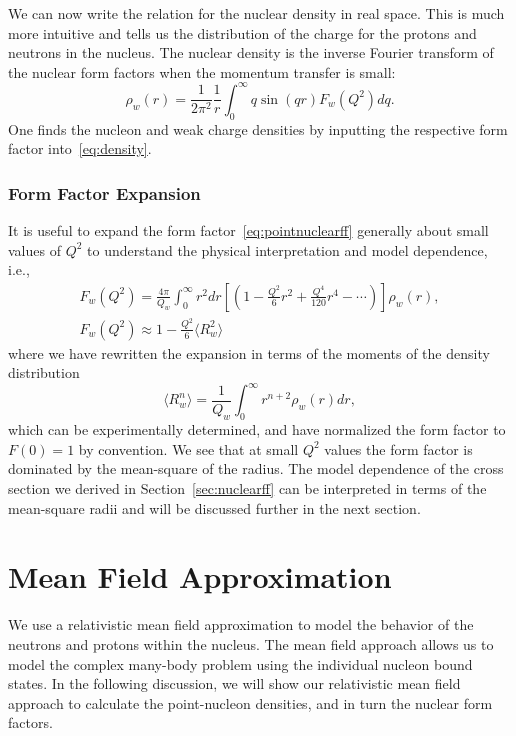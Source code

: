 We can now write the relation for the nuclear density in real space. This is much more intuitive and tells us the distribution of the charge for the protons and neutrons in the nucleus. The nuclear density is the inverse Fourier transform of the nuclear form factors when the momentum transfer is small: 
\begin{equation}\label{eq:density}
\rho _w(r) = \frac{1}{2\pi ^2}\frac{1}{r}\int _0^{\infty} q \sin (qr) F_{w}(Q^2) dq.
\end{equation}
One finds the nucleon and weak charge densities by inputting the respective form factor into~\eqref{eq:density}. 

\subsubsection{Form Factor Expansion}

It is useful to expand the form factor~\eqref{eq:pointnuclearff} generally about small values of $Q^2$ to understand the physical interpretation and model dependence, i.e., 
\begin{gather}
F_w(Q^2) = \frac{4\pi}{Q_w} \int_0^{\infty} r^2dr\left[ \left( 1-\frac{Q^2}{6}r^2+\frac{Q^4}{120}r^4 -\cdots \right) \right] \rho_w(r), \nonumber
\\
F_w(Q^2) \approx 1-\frac{Q^2}{6}\langle R_w^2 \rangle
\end{gather}
where we have rewritten the expansion in terms of the moments of the density distribution 
\begin{equation}\label{eq:rootmean}
\langle R_w^n \rangle = \frac{1}{Q_w} \int_0^{\infty} r^{n+2}\rho _w(r)dr,
\end{equation} 
which can be experimentally determined, and have normalized the form factor to $F(0)=1$ by convention. We see that at small $Q^2$ values the form factor is dominated by the mean-square of the radius. The model dependence of the cross section we derived in Section~\ref{sec:nuclearff} can be interpreted in terms of the mean-square radii and will be discussed further in the next section.

\section{Mean Field Approximation}

We use a relativistic mean field approximation to model the behavior of the neutrons and protons within the nucleus. The mean field approach allows us to model the complex many-body problem using the individual nucleon bound states. In the following discussion, we will show our relativistic mean field approach to calculate the point-nucleon densities, and in turn the nuclear form factors. 

